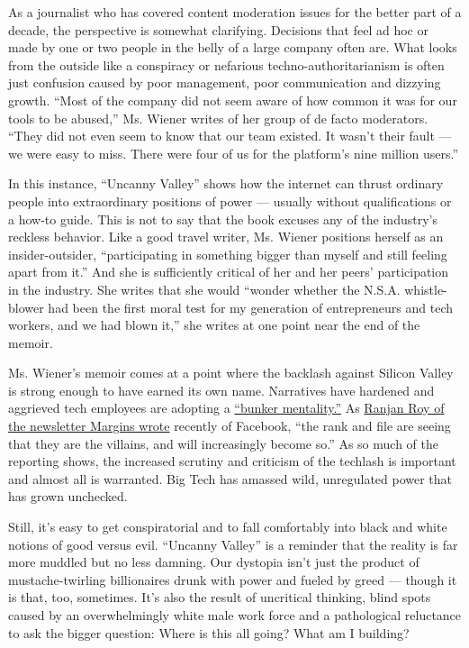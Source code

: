 As a journalist who has covered content moderation issues for the better
part of a decade, the perspective is somewhat clarifying. Decisions that
feel ad hoc or made by one or two people in the belly of a large company
often are. What looks from the outside like a conspiracy or nefarious
techno-authoritarianism is often just confusion caused by poor
management, poor communication and dizzying growth. ``Most of the
company did not seem aware of how common it was for our tools to be
abused,'' Ms. Wiener writes of her group of de facto moderators. ``They
did not even seem to know that our team existed. It wasn't their fault
--- we were easy to miss. There were four of us for the platform's nine
million users.''

In this instance, ``Uncanny Valley'' shows how the internet can thrust
ordinary people into extraordinary positions of power --- usually
without qualifications or a how-to guide. This is not to say that the
book excuses any of the industry's reckless behavior. Like a good travel
writer, Ms. Wiener positions herself as an insider-outsider,
``participating in something bigger than myself and still feeling apart
from it.'' And she is sufficiently critical of her and her peers'
participation in the industry. She writes that she would ``wonder
whether the N.S.A. whistle-blower had been the first moral test for my
generation of entrepreneurs and tech workers, and we had blown it,'' she
writes at one point near the end of the memoir.

Ms. Wiener's memoir comes at a point where the backlash against Silicon
Valley is strong enough to have earned its own name. Narratives have
hardened and aggrieved tech employees are adopting a
\href{https://www.buzzfeednews.com/article/charliewarzel/facebooks-tensions-zuckerberg-sandberg}{``bunker
mentality.''} As
\href{https://themargins.substack.com/p/facebooks-pr-feels-broken}{Ranjan
Roy of the newsletter Margins wrote} recently of Facebook, ``the rank
and file are seeing that they are the villains, and will increasingly
become so.'' As so much of the reporting shows, the increased scrutiny
and criticism of the techlash is important and almost all is warranted.
Big Tech has amassed wild, unregulated power that has grown unchecked.

Still, it's easy to get conspiratorial and to fall comfortably into
black and white notions of good versus evil. ``Uncanny Valley'' is a
reminder that the reality is far more muddled but no less damning. Our
dystopia isn't just the product of mustache-twirling billionaires drunk
with power and fueled by greed --- though it is that, too, sometimes.
It's also the result of uncritical thinking, blind spots caused by an
overwhelmingly white male work force and a pathological reluctance to
ask the bigger question: Where is this all going? What am I building?

